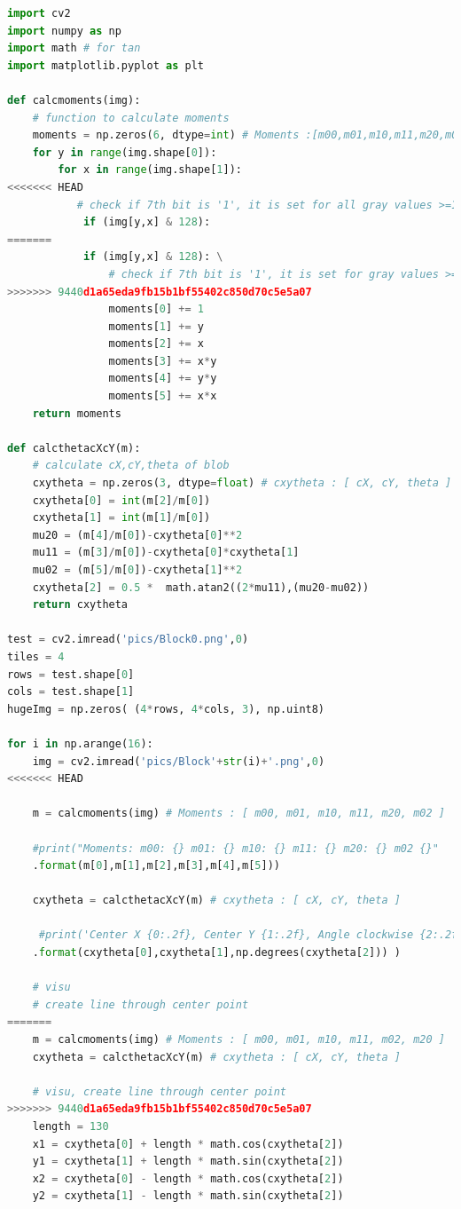 \documentclass[a4paper]{report}
\begin{document}
\begin{lstlisting}[language=Python, caption=Simulation Numeric]
import cv2
import numpy as np 
import math # for tan
import matplotlib.pyplot as plt

def calcmoments(img):
    # function to calculate moments
    moments = np.zeros(6, dtype=int) # Moments :[m00,m01,m10,m11,m20,m02]
    for y in range(img.shape[0]):
        for x in range(img.shape[1]):
<<<<<<< HEAD
           # check if 7th bit is '1', it is set for all gray values >=128
            if (img[y,x] & 128): 
=======
            if (img[y,x] & 128): \
            	# check if 7th bit is '1', it is set for gray values >=128
>>>>>>> 9440d1a65eda9fb15b1bf55402c850d70c5e5a07
                moments[0] += 1
                moments[1] += y
                moments[2] += x
                moments[3] += x*y
                moments[4] += y*y
                moments[5] += x*x
    return moments
    
def calcthetacXcY(m):
    # calculate cX,cY,theta of blob
    cxytheta = np.zeros(3, dtype=float) # cxytheta : [ cX, cY, theta ]
    cxytheta[0] = int(m[2]/m[0])
    cxytheta[1] = int(m[1]/m[0])
    mu20 = (m[4]/m[0])-cxytheta[0]**2
    mu11 = (m[3]/m[0])-cxytheta[0]*cxytheta[1]
    mu02 = (m[5]/m[0])-cxytheta[1]**2
    cxytheta[2] = 0.5 *  math.atan2((2*mu11),(mu20-mu02))
    return cxytheta
    
test = cv2.imread('pics/Block0.png',0)
tiles = 4
rows = test.shape[0]
cols = test.shape[1]
hugeImg = np.zeros( (4*rows, 4*cols, 3), np.uint8)

for i in np.arange(16):
    img = cv2.imread('pics/Block'+str(i)+'.png',0)
<<<<<<< HEAD
    
    m = calcmoments(img) # Moments : [ m00, m01, m10, m11, m20, m02 ]
    
    #print("Moments: m00: {} m01: {} m10: {} m11: {} m20: {} m02 {}"
    .format(m[0],m[1],m[2],m[3],m[4],m[5]))
    
    cxytheta = calcthetacXcY(m) # cxytheta : [ cX, cY, theta ]
    
     #print('Center X {0:.2f}, Center Y {1:.2f}, Angle clockwise {2:.2f}
    .format(cxytheta[0],cxytheta[1],np.degrees(cxytheta[2])) )
    
    # visu
    # create line through center point
=======
    m = calcmoments(img) # Moments : [ m00, m01, m10, m11, m02, m20 ]
    cxytheta = calcthetacXcY(m) # cxytheta : [ cX, cY, theta ]

    # visu, create line through center point
>>>>>>> 9440d1a65eda9fb15b1bf55402c850d70c5e5a07
    length = 130
    x1 = cxytheta[0] + length * math.cos(cxytheta[2])
    y1 = cxytheta[1] + length * math.sin(cxytheta[2]) 
    x2 = cxytheta[0] - length * math.cos(cxytheta[2])
    y2 = cxytheta[1] - length * math.sin(cxytheta[2]) 
 

\end{lstlisting}
\end{document}

